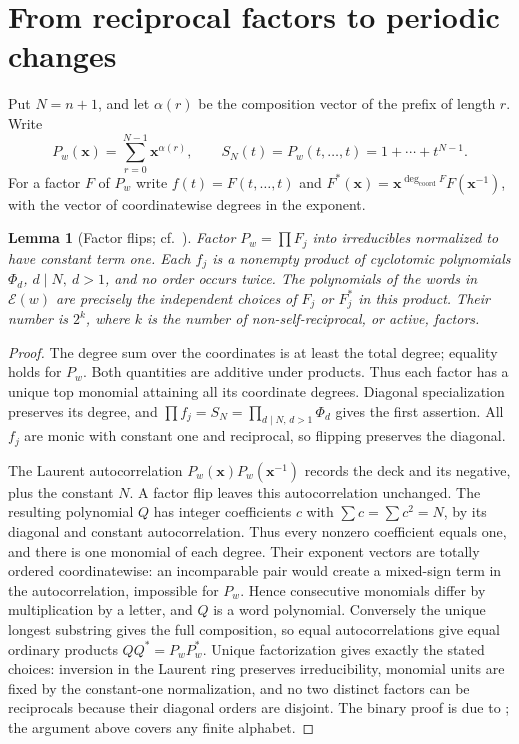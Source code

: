 \documentclass[11pt]{article}
\newtheorem{lemma}[theorem]{Lemma}
\newcommand{\E}{\mathcal E}
\newcommand{\X}{\mathbf x}
\begin{document}
\section{From reciprocal factors to periodic changes}
Put \(N=n+1\), and let \(\alpha(r)\) be the composition vector of the prefix of length \(r\). Write
\[
 P_w(\X)=\sum_{r=0}^{N-1}\X^{\alpha(r)},\qquad
 S_N(t)=P_w(t,\ldots,t)=1+\cdots+t^{N-1}.
\]
For a factor \(F\) of \(P_w\) write \(f(t)=F(t,\ldots,t)\) and \(F^*(\X)=\X^{\deg_{\mathrm{coord}} F}F(\X^{-1})\), with the vector of coordinatewise degrees in the exponent.

\begin{lemma}[Factor flips; cf.\ {\cite[Thm.~12]{admop}}]\label{factor}
Factor \(P_w=\prod F_j\) into irreducibles normalized to have constant term one. Each \(f_j\) is a nonempty product of cyclotomic polynomials \(\Phi_d\), \(d\mid N,\ d>1\), and no order occurs twice. The polynomials of the words in \(\E(w)\) are precisely the independent choices of \(F_j\) or \(F_j^*\) in this product. Their number is \(2^k\), where \(k\) is the number of non-self-reciprocal, or \emph{active}, factors.
\end{lemma}
\begin{proof}
The degree sum over the coordinates is at least the total degree; equality holds for \(P_w\). Both quantities are additive under products. Thus each factor has a unique top monomial attaining all its coordinate degrees. Diagonal specialization preserves its degree, and \(\prod f_j=S_N=\prod_{d\mid N,\,d>1}\Phi_d\) gives the first assertion. All \(f_j\) are monic with constant one and reciprocal, so flipping preserves the diagonal.

The Laurent autocorrelation \(P_w(\X)P_w(\X^{-1})\) records the deck and its negative, plus the constant \(N\). A factor flip leaves this autocorrelation unchanged. The resulting polynomial \(Q\) has integer coefficients \(c\) with \(\sum c=\sum c^2=N\), by its diagonal and constant autocorrelation. Thus every nonzero coefficient equals one, and there is one monomial of each degree. Their exponent vectors are totally ordered coordinatewise: an incomparable pair would create a mixed-sign term in the autocorrelation, impossible for \(P_w\). Hence consecutive monomials differ by multiplication by a letter, and \(Q\) is a word polynomial. Conversely the unique longest substring gives the full composition, so equal autocorrelations give equal ordinary products \(QQ^*=P_wP_w^*\). Unique factorization gives exactly the stated choices: inversion in the Laurent ring preserves irreducibility, monomial units are fixed by the constant-one normalization, and no two distinct factors can be reciprocals because their diagonal orders are disjoint. The binary proof is due to \cite{admop}; the argument above covers any finite alphabet.
\end{proof}
\end{document}
